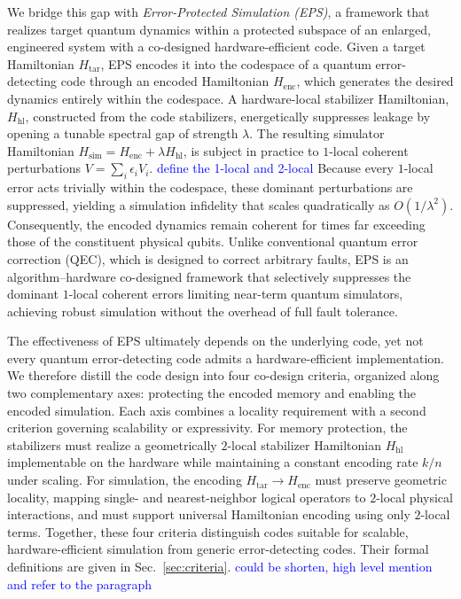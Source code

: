 \documentclass[%
10pt,tightenlines,
superscriptaddress,
 amsmath,amssymb,
 aps,
pra,
]{revtex4-2}
\newcommand{\Htar}{H_{\mathrm{tar}}}
\newcommand{\Henc}{H_{\mathrm{enc}}}
\newcommand{\Hsim}{H_{\mathrm{sim}}}
\newcommand{\sy}[1]{\textcolor{blue}{#1}}
\begin{document}
We bridge this gap with \textit{Error-Protected Simulation (EPS)}, a framework that realizes target quantum dynamics within a protected subspace of an enlarged, engineered system with a co-designed hardware-efficient code. Given a target Hamiltonian $\Htar$, EPS encodes it into the codespace of a quantum error-detecting code through an encoded Hamiltonian $\Henc$, which generates the desired dynamics entirely within the codespace. A hardware-local stabilizer Hamiltonian, $H_{\mathrm{hl}}$, constructed from the code stabilizers, energetically suppresses leakage by opening a tunable spectral gap of strength $\lambda$. The resulting simulator Hamiltonian $\Hsim = \Henc + \lambda H_{\text{hl}}$, is subject in practice to $1$-local coherent perturbations $V=\sum_i\epsilon_iV_i$. \sy{define the 1-local and 2-local} Because every $1$-local error acts trivially within the codespace, these dominant perturbations are suppressed, yielding a simulation infidelity that scales quadratically as $O(1/\lambda^2)$. Consequently, the encoded dynamics remain coherent for times far exceeding those of the constituent physical qubits. Unlike conventional quantum error correction (QEC), which is designed to correct arbitrary faults, EPS is an algorithm--hardware co-designed framework that selectively suppresses the dominant $1$-local coherent errors limiting near-term quantum simulators, achieving robust simulation without the overhead of full fault tolerance.


The effectiveness of EPS ultimately depends on the underlying code, yet not every quantum error-detecting code admits a hardware-efficient implementation. We therefore distill the code design into four co-design criteria, organized along two complementary axes: protecting the encoded memory and enabling the encoded simulation. Each axis combines a locality requirement with a second criterion governing scalability or expressivity. For memory protection, the stabilizers must realize a geometrically $2$-local stabilizer Hamiltonian $H_{\mathrm{hl}}$ implementable on the hardware while maintaining a constant encoding rate $k/n$ under scaling. For simulation, the encoding $\Htar\rightarrow\Henc$ must preserve geometric locality, mapping single- and nearest-neighbor logical operators to $2$-local physical interactions, and must support universal Hamiltonian encoding using only $2$-local terms. Together, these four criteria distinguish codes suitable for scalable, hardware-efficient simulation from generic error-detecting codes. Their formal definitions are given in Sec.~\ref{sec:criteria}.
\sy{could be shorten, high level mention and refer to the paragraph}
\end{document}
